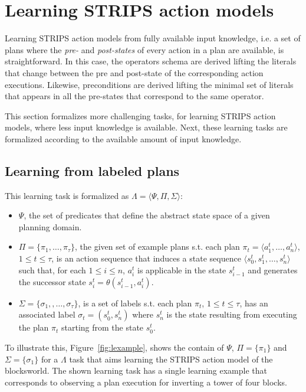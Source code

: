\documentclass[letterpaper]{article} %
\newcommand{\tup}[1]{{\langle #1 \rangle}}
\begin{document}
\section{Learning STRIPS action models}
Learning STRIPS action models from fully available input knowledge, i.e. a set of plans where the {\em pre-} and {\em post-states} of every action in a plan are available, is straightforward. In this case, the operators schema are derived lifting the literals that change between the pre and post-state of the corresponding action executions. Likewise, preconditions are derived lifting the minimal set of literals that appears in all the pre-states that correspond to the same operator.

This section formalizes more challenging tasks, for learning STRIPS action models, where less input knowledge is available. Next, these learning tasks are formalized according to the available amount of input knowledge.

\subsection{Learning from labeled plans}
This learning task is formalized as $\Lambda=\tup{\Psi,\Pi,\Sigma}$: 
\begin{itemize}
\item $\Psi$, the set of predicates that define the abstract state space of a given planning domain. 
\item $\Pi=\{\pi_1,\ldots,\pi_{\tau}\}$, the given set of example plans s.t. each plan $\pi_t=\tup{a_1^t, \ldots, a_n^t}$, {\small $1\leq t\leq \tau$}, is an action sequence that induces a state sequence $\tup{s_0^t, s_1^t, \ldots, s_n^t}$ such that, for each {\small $1\leq i\leq n$}, $a_i^t$ is applicable in the state $s_{i-1}^t$ and generates the successor state $s_i^t=\theta(s_{i-1}^t,a_i^t)$.
\item $\Sigma=\{\sigma_1,,\ldots,\sigma_{\tau}\}$, is a set of labels s.t. each plan $\pi_t$, {\small $1\leq t\leq \tau$}, has an associated label $\sigma_t=(s_0^t,s_{n}^t)$ where $s_{n}^t$ is the state resulting from executing the plan $\pi_t$ starting from the state $s_0^t$. 
\end{itemize}

To illustrate this, Figure~\ref{fig:lexample}, shows the contain of $\Psi$, $\Pi=\{\pi_1\}$ and $\Sigma=\{\sigma_1\}$ for a $\Lambda$ task that aims learning the STRIPS action model of the blocksworld. The shown learning task has a single learning example that corresponds to observing a plan execution for inverting a tower of four blocks.
\end{document}
